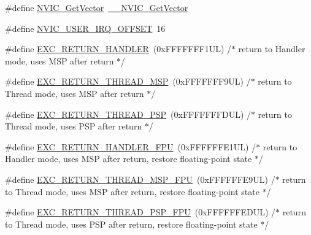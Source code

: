 \begin{DoxyCompactItemize}
\#define \hyperlink{group___c_m_s_i_s___core___n_v_i_c_functions_ga955eb1c33a3dcc62af11a8385e8c0fc8}{N\+V\+I\+C\+\_\+\+Get\+Vector}~\hyperlink{group___c_m_s_i_s___core___n_v_i_c_functions_ga44b665d2afb708121d9b10c76ff00ee5}{\+\_\+\+\_\+\+N\+V\+I\+C\+\_\+\+Get\+Vector}
\item 
\#define \hyperlink{group___c_m_s_i_s___core___n_v_i_c_functions_ga8045d905a5ca57437d8e6f71ffcb6df5}{N\+V\+I\+C\+\_\+\+U\+S\+E\+R\+\_\+\+I\+R\+Q\+\_\+\+O\+F\+F\+S\+ET}~16
\item 
\#define \hyperlink{group___c_m_s_i_s___core___n_v_i_c_functions_gaa6fa2b10f756385433e08522d9e4632f}{E\+X\+C\+\_\+\+R\+E\+T\+U\+R\+N\+\_\+\+H\+A\+N\+D\+L\+ER}~(0x\+F\+F\+F\+F\+F\+F\+F1\+U\+L)     /$\ast$ return to Handler mode, uses M\+S\+P after return                               $\ast$/
\item 
\#define \hyperlink{group___c_m_s_i_s___core___n_v_i_c_functions_gaea4703101b5e679f695e231f7ee72331}{E\+X\+C\+\_\+\+R\+E\+T\+U\+R\+N\+\_\+\+T\+H\+R\+E\+A\+D\+\_\+\+M\+SP}~(0x\+F\+F\+F\+F\+F\+F\+F9\+U\+L)     /$\ast$ return to Thread mode, uses M\+S\+P after return                                $\ast$/
\item 
\#define \hyperlink{group___c_m_s_i_s___core___n_v_i_c_functions_ga9998daf0fbdf31dbc8f81cd604b58175}{E\+X\+C\+\_\+\+R\+E\+T\+U\+R\+N\+\_\+\+T\+H\+R\+E\+A\+D\+\_\+\+P\+SP}~(0x\+F\+F\+F\+F\+F\+F\+F\+D\+U\+L)     /$\ast$ return to Thread mode, uses P\+S\+P after return                                $\ast$/
\item 
\#define \hyperlink{group___c_m_s_i_s___core___n_v_i_c_functions_ga3aa6648e1c3c09fbab1f543b9dcffc3a}{E\+X\+C\+\_\+\+R\+E\+T\+U\+R\+N\+\_\+\+H\+A\+N\+D\+L\+E\+R\+\_\+\+F\+PU}~(0x\+F\+F\+F\+F\+F\+F\+E1\+U\+L)     /$\ast$ return to Handler mode, uses M\+S\+P after return, restore floating-\/point state $\ast$/
\item 
\#define \hyperlink{group___c_m_s_i_s___core___n_v_i_c_functions_gaad4cb3b34fd4264ccfae1fbbc75a3431}{E\+X\+C\+\_\+\+R\+E\+T\+U\+R\+N\+\_\+\+T\+H\+R\+E\+A\+D\+\_\+\+M\+S\+P\+\_\+\+F\+PU}~(0x\+F\+F\+F\+F\+F\+F\+E9\+U\+L)     /$\ast$ return to Thread mode, uses M\+S\+P after return, restore floating-\/point state  $\ast$/
\item 
\#define \hyperlink{group___c_m_s_i_s___core___n_v_i_c_functions_gadd2299e1d3a79c90b610c6b6f4cadb95}{E\+X\+C\+\_\+\+R\+E\+T\+U\+R\+N\+\_\+\+T\+H\+R\+E\+A\+D\+\_\+\+P\+S\+P\+\_\+\+F\+PU}~(0x\+F\+F\+F\+F\+F\+F\+E\+D\+U\+L)     /$\ast$ return to Thread mode, uses P\+S\+P after return, restore floating-\/point state  $\ast$/

\end{DoxyCompactItemize}
